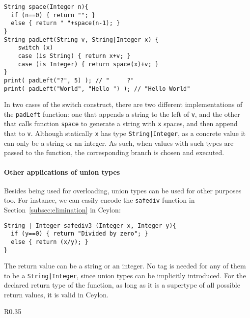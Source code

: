 \begin{lstlisting}
String space(Integer n){
  if (n==0) { return ""; }
  else { return " "+space(n-1); }
}
String padLeft(String v, String|Integer x) {
	switch (x)
	case (is String) { return x+v; }
	case (is Integer) { return space(x)+v; }
}
print( padLeft("?", 5) ); // "     ?"
print( padLeft("World", "Hello ") ); // "Hello World"
\end{lstlisting}
%

\noindent In two cases of the switch construct, there are two different implementations
of the \lstinline{padLeft} function: one that appends a string to the left of \lstinline{v},
and the other that calls function \lstinline{space} to generate a string with \lstinline{x} spaces,
and then append that to \lstinline{v}.
Although statically \lstinline{x} has type \lstinline{String|Integer}, as a concrete value
it can only be a string or an integer.
As such, when values with such types are passed to the function,
the corresponding branch is chosen and executed.

\paragraph{Other applications of union types}
Besides being used for overloading, union types can be used for other purposes too.
For instance, we can easily encode the \lstinline{safediv} function in Section~\ref{subsec:elimination}
in Ceylon:
%
\begin{lstlisting}
String | Integer safediv3 (Integer x, Integer y){
  if (y==0) { return "Divided by zero"; }
  else { return (x/y); }
}
\end{lstlisting}
%
The return value can be a string or an integer.
No tag is needed for any of them to be a \lstinline{String|Integer},
since union types can be implicitly introduced.
For the declared return type of the function, as long as it is
a supertype of all possible return values, it is valid
in Ceylon.

\begin{wrapfigure}{R}{0.35\textwidth}
\begin{center}
\end{center}
\end{wrapfigure}

